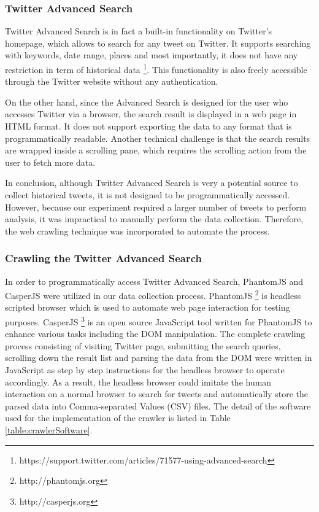 \subsubsection{Twitter Advanced Search}
Twitter Advanced Search is in fact a built-in functionality on Twitter's homepage, which allows to search for any tweet on Twitter. It supports searching with keywords, date range, places and most importantly, it does not have any restriction in term of historical data \footnote{https://support.twitter.com/articles/71577-using-advanced-search}. This functionality is also freely accessible through the Twitter website without any authentication.

On the other hand, since the Advanced Search is designed for the user who accesses Twitter via a browser, the search result is displayed in a web page in HTML format. It does not support exporting the data to any format that is programmatically readable. Another technical challenge is that the search results are wrapped inside a scrolling pane, which requires the scrolling action from the user to fetch more data. 

In conclusion, although Twitter Advanced Search is very a potential source to collect historical tweets, it is not designed to be programmatically accessed. However, because our experiment required a larger number of tweets to perform analysis, it was impractical to manually perform the data collection. Therefore, the web crawling technique was incorporated to automate the process.

\subsubsection{Crawling the Twitter Advanced Search}
In order to programmatically access Twitter Advanced Search, PhantomJS and CasperJS were utilized in our data collection process. PhantomJS \footnote{http://phantomjs.org} is headless scripted browser which is used to automate web page interaction for testing purposes. CasperJS \footnote{http://casperjs.org} is an open source JavaScript tool written for PhantomJS to enhance various tasks including the DOM manipulation. The complete crawling process consisting of visiting Twitter page, submitting the search queries, scrolling down the result list and parsing the data from the DOM were written in JavaScript as step by step instructions for the headless browser to operate accordingly. As a result, the headless browser could imitate the human interaction on a normal browser to search for tweets and automatically store the parsed data into Comma-separated Values (CSV) files. The detail of the software used for the implementation of the crawler is listed in Table \ref{table:crawlerSoftware}.


